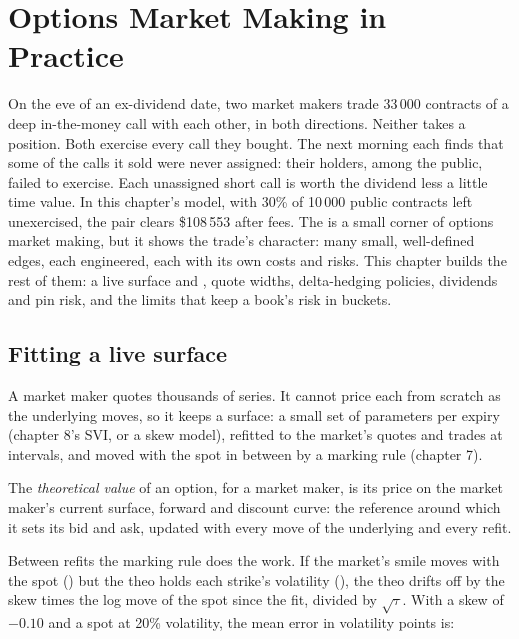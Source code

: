 \chapter{Options Market Making in Practice}\label{ch:dv:options-market-making-in-practice}

On the eve of an ex-dividend date, two market makers trade 33\,000 contracts of a deep in-the-money call with each other, in both directions.
Neither takes a position. Both exercise every call they bought. The next morning each finds that some of the calls it sold were never assigned:
their holders, among the public, failed to exercise. Each unassigned short call is worth the dividend less a little time value. In this chapter's
model, with 30\% of 10\,000 public contracts left unexercised, the pair clears \$108\,553 after fees. The  is a small corner of options
market making, but it shows the trade's character: many small, well-defined edges, each engineered, each with its own costs and risks. This
chapter builds the rest of them: a live surface and , quote widths, delta-hedging policies, dividends and pin risk, and the
limits that keep a book's risk in buckets.

\section{Fitting a live surface}

A market maker quotes thousands of series. It cannot price each from scratch as the underlying moves, so it keeps a surface: a small set of
parameters per expiry (chapter 8's SVI, or a skew model), refitted to the market's quotes and trades at intervals, and moved with the spot in
between by a marking rule (chapter 7).

\begin{definition}\label{def:dv:options-market-making-in-practice:theo}
The \emph{theoretical value} of an option, for a market maker, is its price on the market maker's current surface,
forward and discount curve: the reference around which it sets its bid and ask, updated with every move of the underlying and every refit.
\end{definition}

Between refits the marking rule does the work. If the market's smile moves with the spot () but the theo holds each strike's volatility
(), the theo drifts off by the skew times the log move of the spot since the fit, divided by $\sqrt\tau$. With a skew of $-0.10$ and a
spot at 20\% volatility, the mean error in volatility points is:

